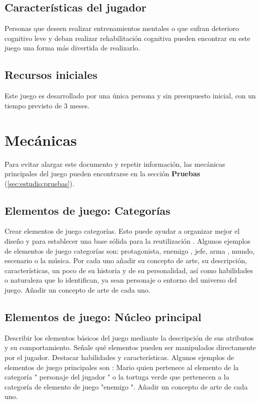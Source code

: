 \subsection{Características del jugador}
Personas que deseen realizar entrenamientos mentales o que sufran deterioro cognitivo leve y deban realizar rehabilitación cognitiva pueden encontrar en este juego una forma más divertida de realizarlo. 


\subsection{Recursos iniciales}
Este juego es desarrollado por una única persona y sin presupuesto inicial, con un tiempo previsto de 3 meses.


\section{Mecánicas}

Para evitar alargar este documento y repetir información, las mecánicas principales del juego pueden encontrarse en la sección \textbf{Pruebas} (\ref{sec:estudio:pruebas}).


\subsection{Elementos de juego: Categorías}
Crear elementos de juego categorías. Esto puede ayudar a organizar mejor el diseño y para establecer una base sólida para la reutilización . Algunos ejemplos de elementos de juego categorías son: protagonista, enemigo , jefe, arma , mundo, escenario o la música. Por cada uno añadir su concepto de arte, su descripción, características, un poco de su historia y de su personalidad, así como habilidades o naturaleza que lo identifican, ya sean personaje o entorno del universo del juego. Añadir un concepto de arte de cada uno.

\subsection{Elementos de juego: Núcleo principal}
Describir los elementos básicos del juego mediante la descripción de sus atributos y su comportamiento. Señale qué elementos pueden ser manipulados directamente por el jugador. Destacar habilidades y características. Algunos ejemplos de elementos de juego principales son : Mario quien pertenece al elemento de la categoría " personaje del jugador " o la tortuga verde que pertenecen a la categoría de elemento de juego "enemigo ". Añadir un concepto de arte de cada uno.

